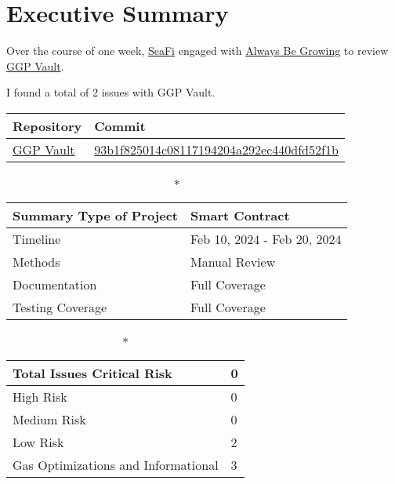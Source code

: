 \hypertarget{executive-summary}{%
\section{Executive Summary}\label{executive-summary}}

Over the course of one week, \href{https://seafi.app}{SeaFi} engaged with
\href{http://abg.garden}{Always Be Growing} to review
\href{https://github.com/SeaFi-Labs/GGP-Vault}{GGP Vault}. 

I found a total of 2 issues with GGP Vault. 

\begin{longtable}[c]{|l|l|}
\hline \textbf{Repository} & \textbf{Commit} \\

\hline
\href{https://github.com/SeaFi-Labs/GGP-Vault}{GGP Vault} &
\href{https://github.com/SeaFi-Labs/GGP-Vault/commit/93b1f825014c08117194204a292ec440dfd52f1b}{93b1f825014c08117194204a292ec440dfd52f1b} \\
\hline
\end{longtable}

\begin{longtable}[]{|l|l|}

\caption*{\textbf{Summary}}
\hline Type of Project & Smart Contract \\   
\hline Timeline & Feb 10, 2024 - Feb 20, 2024   \\
\hline Methods & Manual Review \\
\hline Documentation & Full Coverage \\
\hline Testing Coverage & Full Coverage \\
\hline
\end{longtable}


\begin{longtable}[]{|l|l|}
\caption*{\textbf{Total Issues}}
\hline Critical Risk & 0 \\
\hline High Risk & 0 \\
\hline Medium Risk & 0 \\ 
\hline Low Risk & 2 \\
\hline Gas Optimizations and Informational & 3 \\
\hline
\end{longtable}

